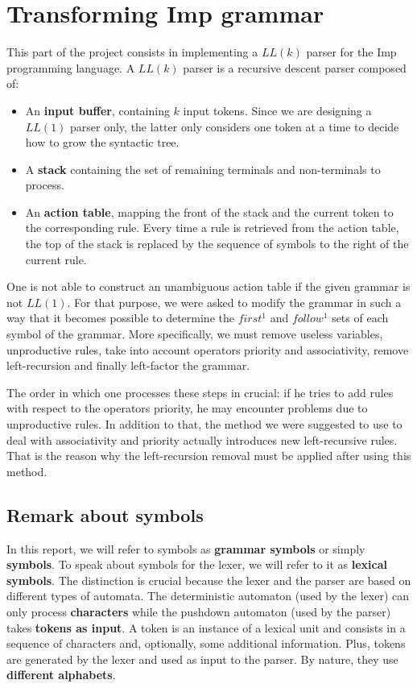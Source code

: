 \section{Transforming Imp grammar}

This part of the project consists in implementing a $LL(k)$ parser for the Imp programming language. A $LL(k)$ parser is a recursive descent parser composed of:

\begin{itemize}
\item An \textbf{input buffer}, containing $k$ input tokens. Since we are designing a $LL(1)$ parser only, the latter only considers one token at a time to decide how to grow the syntactic tree.
\item A \textbf{stack} containing the set of remaining terminals and non-terminals to process.
\item An \textbf{action table}, mapping the front of the stack and the current token to the corresponding rule. Every time a rule is retrieved from the action table, the top of the stack is replaced by the sequence of symbols to the right of the current rule.
\end{itemize}

One is not able to construct an unambiguous action table if the given grammar is not $LL(1)$. For that purpose, we were asked to modify the grammar in such a way
that it becomes possible to determine the $first^1$ and $follow^1$ sets of each symbol of the grammar. More specifically,
we must remove useless variables, unproductive rules, take into account operators priority and associativity, remove left-recursion and finally left-factor the grammar.

The order in which one processes these steps in crucial: if he tries to add rules with respect to the operators
priority, he may encounter problems due to unproductive rules. In addition to that, the method we were suggested to use
to deal with associativity and priority actually introduces new left-recursive rules. That is the reason why the
left-recursion removal must be applied after using this method.

\subsection{Remark about symbols}
In this report, we will refer to symbols as \textbf{grammar symbols} or simply \textbf{symbols}.
To speak about symbols for the lexer, we will refer to it as \textbf{lexical symbols}.
The distinction is crucial because the lexer and the parser are based on different types of automata.
The deterministic automaton (used by the lexer) can only process \textbf{characters} while the pushdown automaton (used by the parser) takes \textbf{tokens as input}.
A token is an instance of a lexical unit and consists in a sequence of characters and, optionally, some additional information.
Plus, tokens are generated by the lexer and used as input to the parser.
By nature, they use \textbf{different alphabets}.


